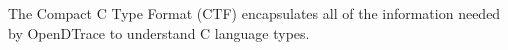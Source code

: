 The Compact C Type Format (CTF) encapsulates all of the information
needed by OpenDTrace to understand C language types.

